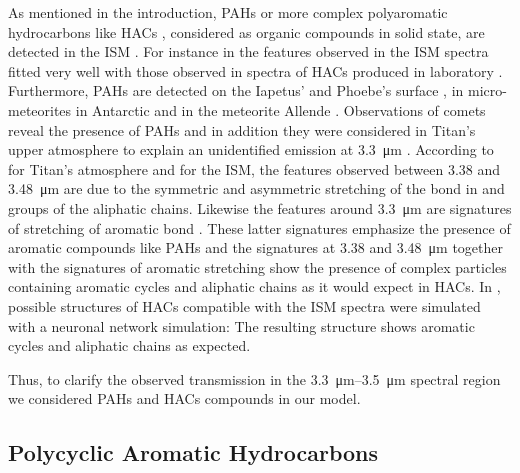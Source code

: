 \documentclass{arxiv-icarus}
\begin{document}
As mentioned in the introduction, PAHs or more complex polyaromatic hydrocarbons like HACs \citep{Dartois2004,Dartois2005,Dartois2007}, considered as organic compounds in solid state, are detected in the ISM \citep{Sandford1991,Pendleton2002}.
For instance in \cite{Dartois2004} the features observed in the ISM spectra fitted very well with those observed in spectra of HACs produced in laboratory \citep{Dartois2004,Dartois2005}. Furthermore, PAHs are detected on the Iapetus' and Phoebe's surface \citep{Cruikshank2008}, in micro-meteorites in Antarctic \citep{Becker1997} and in the meteorite Allende \citep{Becker1997a}. Observations of comets reveal the presence of PAHs \citep{Li2009} and
in addition they were considered in Titan's upper atmosphere to explain an unidentified emission at \SI{3.3}{\um} \citep{Dinelli2013,Lopez-Puertas2013}. According to \cite{Bellucci2009} for Titan's atmosphere and \cite{Dartois2004,Dartois2005,Dartois2007,Sandford1991,Pendleton2002} for the ISM, the features observed between \num{3.38} and \SI{3.48}{\um} are due to the symmetric and asymmetric stretching of the  bond in  and  groups of the aliphatic chains. Likewise the features around \SI{3.3}{\um} are signatures of stretching of aromatic  bond \citep{Bellucci2009,Dartois2004,Dartois2005,Dartois2007}. These latter signatures emphasize the presence of aromatic compounds like PAHs and the signatures at \num{3.38} and \SI{3.48}{\um} together with the signatures of aromatic  stretching show the presence of complex particles containing aromatic cycles and aliphatic chains as it would expect in HACs. In \cite{Dartois2005}, possible structures of HACs compatible with the ISM spectra were simulated with a neuronal network simulation: The resulting structure shows aromatic cycles and aliphatic chains as expected.

Thus, to clarify the observed transmission in the \SIrange{3.3}{3.5}{\um} spectral region we considered PAHs and HACs compounds in our model.


\subsection{Polycyclic Aromatic Hydrocarbons}
\end{document}
